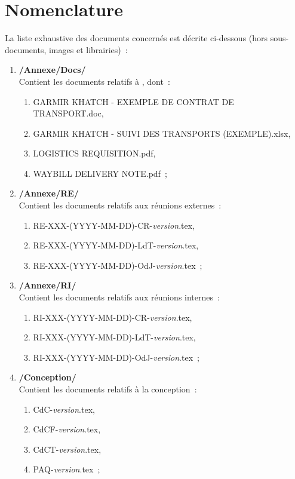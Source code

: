 \documentclass[11pt,fleqn]{report}
\begin{document}
\section{Nomenclature}
La liste exhaustive des documents concernés est décrite ci-dessous (hors sous-documents, images et librairies)~:
\begin{enumerate}
	\item \textbf{/Annexe/Docs/}
	\\
	Contient les documents relatifs à \mo, dont~:
	\begin{enumerate}
		\item GARMIR KHATCH - EXEMPLE DE CONTRAT DE TRANSPORT.doc,
		\item GARMIR KHATCH - SUIVI DES TRANSPORTS (EXEMPLE).xlsx,
		\item LOGISTICS REQUISITION.pdf,
		\item WAYBILL DELIVERY NOTE.pdf~;
	\end{enumerate}
	\item \textbf{/Annexe/RE/}
	\\
	Contient les documents relatifs aux réunions externes~:
	\begin{enumerate}
		\item RE-XXX-(YYYY-MM-DD)-CR-\textit{version}.tex,
		\item RE-XXX-(YYYY-MM-DD)-LdT-\textit{version}.tex,
		\item RE-XXX-(YYYY-MM-DD)-OdJ-\textit{version}.tex~;
	\end{enumerate}
	\item \textbf{/Annexe/RI/}
	\\
	Contient les documents relatifs aux réunions internes~:
	\begin{enumerate}
		\item RI-XXX-(YYYY-MM-DD)-CR-\textit{version}.tex,
		\item RI-XXX-(YYYY-MM-DD)-LdT-\textit{version}.tex,
		\item RI-XXX-(YYYY-MM-DD)-OdJ-\textit{version}.tex~;
	\end{enumerate}
	\item \textbf{/Conception/}
	\\
	Contient les documents relatifs à la conception~:
	\begin{enumerate}
		\item CdC-\textit{version}.tex,
		\item CdCF-\textit{version}.tex,
		\item CdCT-\textit{version}.tex,
		\item PAQ-\textit{version}.tex~;

\end{enumerate}
\end{enumerate}
\end{document}
